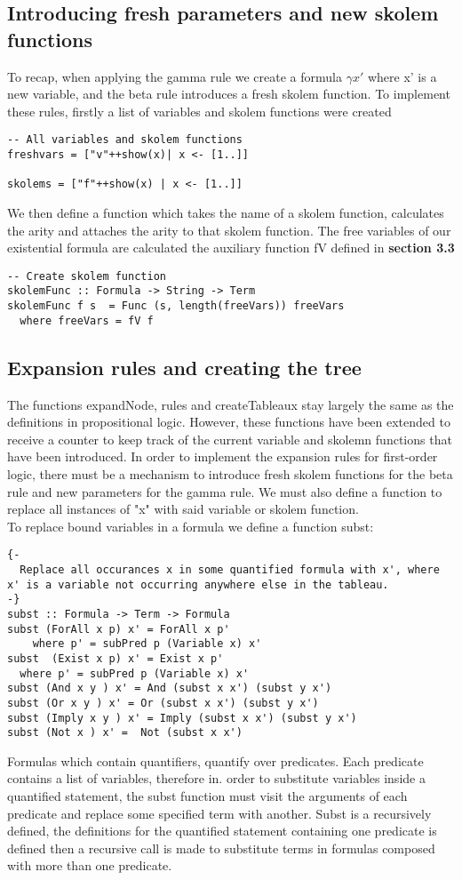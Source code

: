 \documentclass{article}%
\begin{document}
\subsection{Introducing fresh parameters and new skolem functions}
To recap, when applying the gamma rule we create a formula $\gamma{x'}$ where x' is a new variable, and the beta rule introduces a fresh skolem function. 
To implement these rules, firstly a list of variables and skolem functions were created
\begin{verbatim}
-- All variables and skolem functions
freshvars = ["v"++show(x)| x <- [1..]]

skolems = ["f"++show(x) | x <- [1..]]
\end{verbatim}
We then define a function which takes the name of a skolem function, calculates the arity and attaches the arity to that skolem function. The free variables of our existential formula are calculated the auxiliary function fV defined in \textbf{section 3.3}
\begin{verbatim}
-- Create skolem function
skolemFunc :: Formula -> String -> Term
skolemFunc f s  = Func (s, length(freeVars)) freeVars
  where freeVars = fV f
\end{verbatim}

\subsection{Expansion rules and creating the tree}
The functions expandNode, rules and createTableaux stay largely the same as the definitions in propositional logic. However, these functions have been extended to receive a counter to keep track of the current variable and skolemn functions that have been introduced. In order to implement the expansion rules for first-order logic, there must be a mechanism to introduce fresh skolem functions for the beta rule and new parameters for the gamma rule. We must also define a function to replace all instances of "x" with said variable or skolem function. \\
To replace bound variables in a formula we define a function subst:
\begin{verbatim}
{-
  Replace all occurances x in some quantified formula with x', where x' is a variable not occurring anywhere else in the tableau.
-}
subst :: Formula -> Term -> Formula 
subst (ForAll x p) x' = ForAll x p'
    where p' = subPred p (Variable x) x'
subst  (Exist x p) x' = Exist x p'
  where p' = subPred p (Variable x) x'
subst (And x y ) x' = And (subst x x') (subst y x')
subst (Or x y ) x' = Or (subst x x') (subst y x')
subst (Imply x y ) x' = Imply (subst x x') (subst y x')
subst (Not x ) x' =  Not (subst x x') 
\end{verbatim}
Formulas which contain quantifiers, quantify over predicates. Each predicate contains a list of variables, therefore in. order to substitute variables inside a quantified statement, the subst function must visit the arguments of each predicate and replace some specified term with another. Subst is a recursively defined, the definitions for the quantified statement containing one predicate is defined then a recursive call is made to substitute terms in formulas composed with more than one predicate. 
\end{document}

